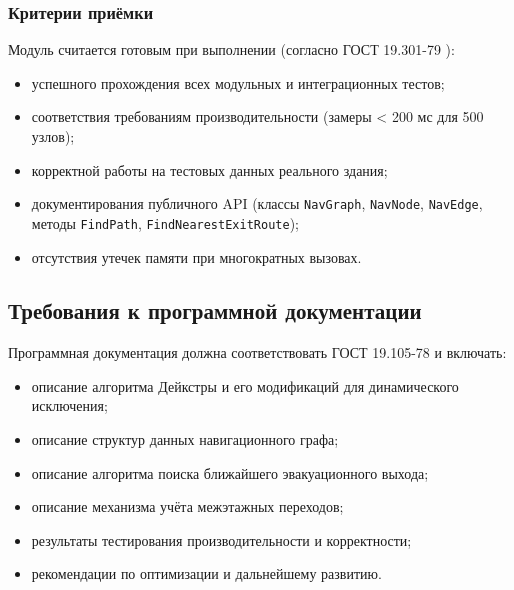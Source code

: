 \subsubsection{Критерии приёмки}

Модуль считается готовым при выполнении (согласно ГОСТ 19.301-79 \cite{gost19301}):
\begin{itemize}
\item успешного прохождения всех модульных и интеграционных тестов;
\item соответствия требованиям производительности (замеры < 200 мс для 500 узлов);
\item корректной работы на тестовых данных реального здания;
\item документирования публичного API (классы \texttt{NavGraph}, \texttt{NavNode}, \texttt{NavEdge}, методы \texttt{FindPath}, \texttt{FindNearestExitRoute});
\item отсутствия утечек памяти при многократных вызовах.
\end{itemize}

\subsection{Требования к программной документации}

Программная документация должна соответствовать ГОСТ 19.105-78 \cite{gost19105} и включать:
\begin{itemize}
\item описание алгоритма Дейкстры и его модификаций для динамического исключения;
\item описание структур данных навигационного графа;
\item описание алгоритма поиска ближайшего эвакуационного выхода;
\item описание механизма учёта межэтажных переходов;
\item результаты тестирования производительности и корректности;
\item рекомендации по оптимизации и дальнейшему развитию.
\end{itemize}

